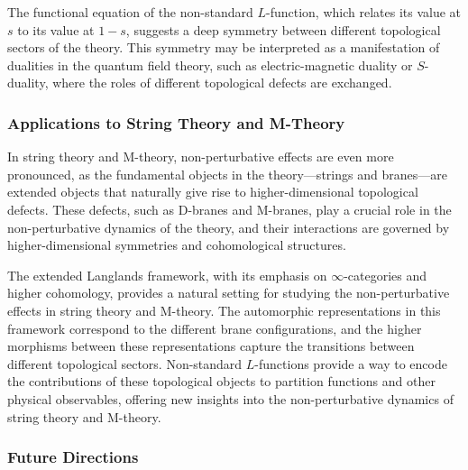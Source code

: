 \documentclass{article}
\theoremstyle{remark}
\begin{document}
The functional equation of the non-standard $L$-function, which relates its value at $s$ to its value at $1 - s$, suggests a deep symmetry between different topological sectors of the theory. This symmetry may be interpreted as a manifestation of dualities in the quantum field theory, such as electric-magnetic duality or $S$-duality, where the roles of different topological defects are exchanged.

\subsubsection{Applications to String Theory and M-Theory}

In string theory and M-theory, non-perturbative effects are even more pronounced, as the fundamental objects in the theory—strings and branes—are extended objects that naturally give rise to higher-dimensional topological defects. These defects, such as D-branes and M-branes, play a crucial role in the non-perturbative dynamics of the theory, and their interactions are governed by higher-dimensional symmetries and cohomological structures.

The extended Langlands framework, with its emphasis on $\infty$-categories and higher cohomology, provides a natural setting for studying the non-perturbative effects in string theory and M-theory. The automorphic representations in this framework correspond to the different brane configurations, and the higher morphisms between these representations capture the transitions between different topological sectors. Non-standard $L$-functions provide a way to encode the contributions of these topological objects to partition functions and other physical observables, offering new insights into the non-perturbative dynamics of string theory and M-theory.

\subsubsection{Future Directions}
\end{document}
